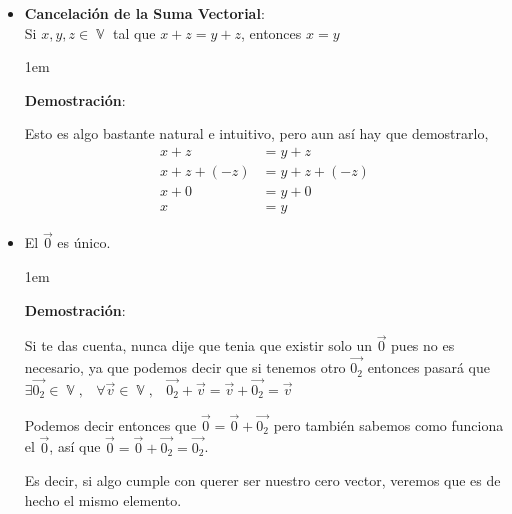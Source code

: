 \documentclass[12pt, fleqn]{report}                             %
\newenvironment{SmallIndentation}[1][0.75em]                    %
        {\begin{adjustwidth}{#1}{}\begin{footnotesize}}             %
        {\end{footnotesize}\end{adjustwidth}}                       %
\DeclareMathOperator \Space {\quad}                             %
\DeclareMathOperator \MiniSpace {\;}                            %
\theoremstyle{break}                                            %
\DeclareMathOperator \VectorSet    {\mathbb{V}}                 %
\begin{document}
            \begin{itemize}

                \item \textbf{Cancelación de la Suma Vectorial}:\\
                    Si $x, y, z \in \VectorSet$ tal que $x + z = y + z$, entonces $x = y$

                    \begin{SmallIndentation}[1em]
                        \textbf{Demostración}:

                        Esto es algo bastante natural e intuitivo, pero aun así hay que demostrarlo, 
                        \begin{align*}
                            x + z &= y + z                  \\
                            x + z + (-z) &= y + z + (-z)    \\
                            x + 0 &= y + 0                  \\
                            x &= y                          
                        \end{align*}

                    \end{SmallIndentation}


                \item El $\vec{0}$ es único.

                    \begin{SmallIndentation}[1em]
                        \textbf{Demostración}:

                        Si te das cuenta, nunca dije que tenia que existir solo un $\vec{0}$ pues no es
                        necesario, ya que podemos decir que si tenemos otro $\vec{0_2}$ entonces pasará que 
                        $\exists \vec{0_2} \in \VectorSet, \MiniSpace
                            \forall \vec{v} \in \VectorSet, \MiniSpace
                                \vec{0_2} + \vec{v} = \vec{v} + \vec{0_2} = \vec{v}$

                        Podemos decir entonces que $\vec{0} = \vec{0}+\vec{0_2}$ pero también sabemos como
                        funciona el $\vec{0}$, así que $\vec{0} = \vec{0}+\vec{0_2} = \vec{0_2}$.

                        Es decir, si algo cumple con querer ser nuestro cero vector, veremos que es de hecho
                        el mismo elemento.


\end{SmallIndentation}
\end{itemize}
\end{document}
